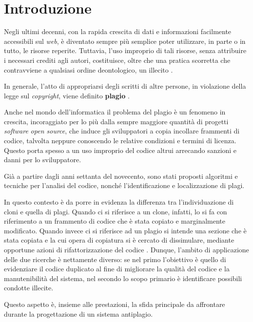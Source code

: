 \chapter{Introduzione}
\label{chapter:introduction}
Negli ultimi decenni, con la rapida crescita di dati e informazioni facilmente accessibili sul \textit{web}, è diventato sempre più semplice poter utilizzare, in parte o in tutto, le risorse reperite.
%
Tuttavia, l'uso improprio di tali risorse, senza attribuire i necessari crediti agli autori, costituisce, oltre che una pratica scorretta che contravviene a qualsiasi ordine deontologico, un illecito \cite{copyright-law-italia}.

In generale, l'atto di appropriarsi degli scritti di altre persone, in violazione della legge sul \textit{copyright}, viene definito \textbf{plagio} \cite{britannica}.

Anche nel mondo dell'informatica il problema del plagio è un fenomeno in crescita, incoraggiato per lo più dalla sempre maggiore quantità di progetti \textit{software} \textit{open source}, che induce gli sviluppatori a copia incollare frammenti di codice, talvolta neppure conoscendo le relative condizioni e termini di licenza.
%
Questo porta spesso a un uso improprio del codice altrui arrecando sanzioni e danni per lo sviluppatore.

Già a partire dagli anni settanta del novecento, sono stati proposti algoritmi e tecniche per l'analisi del codice, nonché l'identificazione e localizzazione di plagi.

In questo contesto è da porre in evidenza la differenza tra l'individuazione di cloni e quella di plagi.
%
Quando ci si riferisce a un clone, infatti, lo si fa con riferimento a un frammento di codice che è stata copiato e marginalmente modificato. 
%
Quando invece ci si riferisce ad un plagio si intende una sezione che è stata copiata e la cui opera di copiatura si è cercato di dissimulare, mediante opportune azioni di rifattorizzazione del codice \cite{muddu-et-al-2013}.  
%
Dunque, l'ambito di applicazione delle due ricerche è nettamente diverso: se nel primo l'obiettivo è quello di evidenziare il codice duplicato al fine di migliorare la qualità del codice e la manutenibilità del sistema, nel secondo lo scopo primario è identificare possibili condotte illecite.

Questo aspetto è, insieme alle prestazioni, la sfida principale da affrontare durante la progettazione di un sistema antiplagio.


